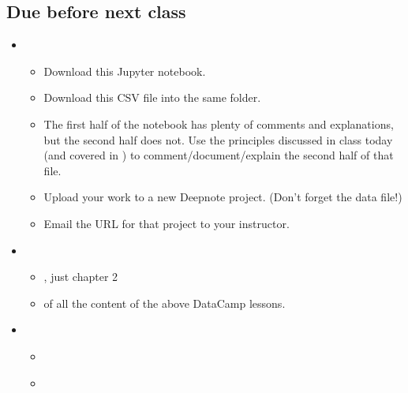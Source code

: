 \documentclass[letterpaper,10pt,english]{sphinxmanual}
\begin{document}
\subsection{Due before next class}
\label{\detokenize{course-schedule:id4}}\begin{itemize}
\item {} 
\begin{itemize}
\item {} 
Download this Jupyter notebook.

\item {} 
Download this CSV file into the same folder.

\item {} 
The first half of the notebook has plenty of comments and explanations, but the second half does not.  Use the principles discussed in class today (and covered in {\hyperref[\detokenize{chapter-5-before-and-after::doc}]{}}) to comment/document/explain the second half of that file.

\item {} 
Upload your work to a new Deepnote project.  (Don’t forget the data file!)

\item {} 
Email the URL for that project to your instructor.

\end{itemize}

\item {} 
\begin{itemize}
\item {} 
, just chapter 2

\item {} 
 of all the content of the above DataCamp lessons.

\end{itemize}

\item {} 
\begin{itemize}
\item {} 
{\hyperref[\detokenize{chapter-7-abstraction::doc}]{}}

\item {} 
{\hyperref[\detokenize{chapter-8-version-control::doc}]{}}

\end{itemize}

\end{itemize}
\end{document}
